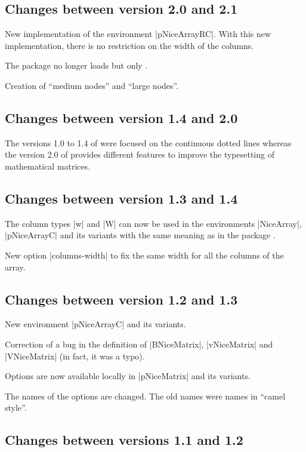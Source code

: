\documentclass[dvipsnames]{article}%
\begin{document}
\subsection*{Changes between version 2.0 and 2.1}

New implementation of the environment |{pNiceArrayRC}|. With this new
implementation, there is no restriction on the width of the columns.

The package  no longer loads  but only
. 

Creation of ``medium nodes'' and ``large nodes''.

\subsection*{Changes between version 1.4 and 2.0}

The versions 1.0 to 1.4 of  were focused on the continuous
dotted lines whereas the version 2.0 of  provides different
features to improve the typesetting of mathematical matrices. 

\subsection*{Changes between version 1.3 and 1.4}

The column types |w| and |W| can now be used in the environments
|{NiceArray}|, |{pNiceArrayC}| and its variants with the same meaning as in
the package . 

New option |columns-width| to fix the same width for all the columns of the
array. 

\subsection*{Changes between version 1.2 and 1.3}

New environment |{pNiceArrayC}| and its variants.

Correction of a bug in the definition of |{BNiceMatrix}|, |{vNiceMatrix}| and
|{VNiceMatrix}| (in fact, it was a typo).

Options are now available locally in |{pNiceMatrix}| and its variants. 

The names of the options are changed. The old names were names in ``camel
style''. 

\subsection*{Changes between versions 1.1 and 1.2}
\end{document}
